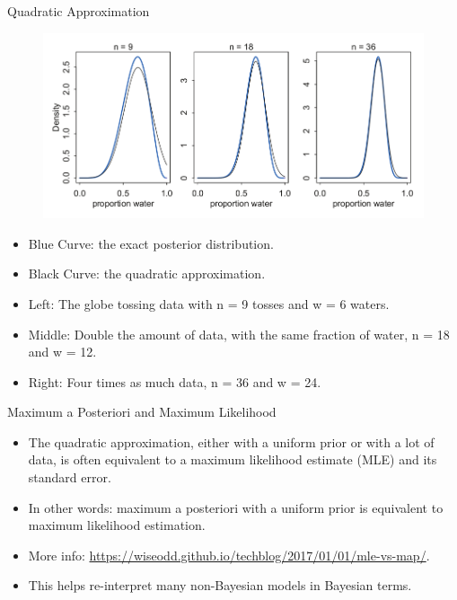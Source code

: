 \documentclass[handout]{beamer}
\begin{document}
\begin{frame}{Quadratic Approximation}
\scriptsize{

\begin{figure}[h!]
	\centering
	\includegraphics[scale=0.3]{pics/quadratic.png}
\end{figure}
 
\begin{itemize}
 \item Blue Curve: the exact posterior distribution. 
 \item Black Curve: the quadratic approximation.
 \item Left: The globe tossing data with n = 9 tosses and w = 6 waters.
 \item Middle: Double the amount of data, with the same fraction of water, n = 18 and w = 12.
 \item Right: Four times as much data, n = 36 and w = 24.
\end{itemize}


} 

\end{frame}


\begin{frame}{Maximum a Posteriori and Maximum Likelihood}
\scriptsize{

\begin{itemize}
\item The quadratic approximation, either with a uniform prior or with a lot of data, is often equivalent to a maximum likelihood estimate (MLE) and its standard error.
\item In other words: maximum a posteriori with a uniform prior is equivalent to maximum likelihood estimation.
\item More info: \url{https://wiseodd.github.io/techblog/2017/01/01/mle-vs-map/}.
\item This helps re-interpret many non-Bayesian models in Bayesian terms.
\end{itemize}


} 
\end{frame}
\end{document}

